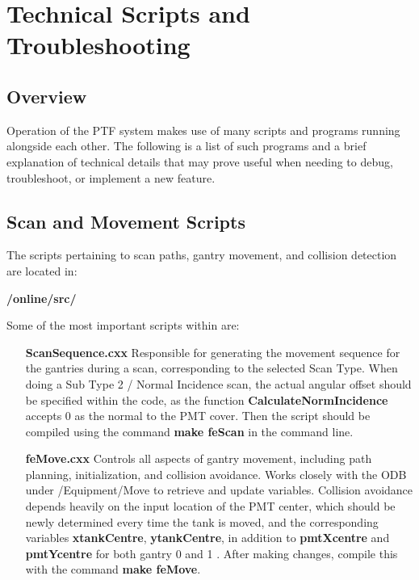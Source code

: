 \documentclass[twoside,letterpaper]{refart}
\begin{document}
\section{Technical Scripts and Troubleshooting}

\subsection{Overview}

Operation of the PTF system makes use of many scripts and programs running alongside each other. The following is a list of such programs and a brief explanation of technical details that may prove useful when needing to debug, troubleshoot, or implement a new feature.

\subsection{Scan and Movement Scripts} \label{scanScripts}

The scripts pertaining to scan paths, gantry movement, and collision detection are located in:

\textbf{/online/src/}

Some of the most important scripts within are:

\begin{itemize}
	\item [\textbf{ScanSequence.cxx}] Responsible for generating the movement sequence for the gantries during a scan, corresponding to the selected Scan Type. When doing a Sub Type 2 / Normal Incidence scan, the actual angular offset should be specified within the code, as the function \textbf{CalculateNormIncidence} accepts 0 as the normal to the PMT cover. Then the script should be compiled using the command \textbf{make feScan} in the command line.
	\item [\textbf{feMove.cxx}] Controls all aspects of gantry movement, including path planning, initialization, and collision avoidance. Works closely with the ODB under /Equipment/Move to retrieve and update variables. Collision avoidance depends heavily on the input location of the PMT center, which should be newly determined every time the tank is moved, and the corresponding variables \textbf{xtankCentre}, \textbf{ytankCentre}, in addition to \textbf{pmtXcentre} and \textbf{pmtYcentre} for both gantry 0 and 1 . After making changes, compile this with the command \textbf{make feMove}.
\end{itemize}
\end{document}

